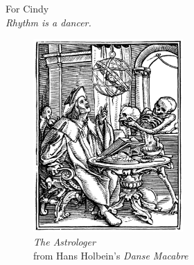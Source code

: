 
For Cindy\\ 
\vspace{\baselineskip}
\emph{Rhythm is a dancer.}

\begin{figure}
    \vspace{50pt}
    \centering
    \includegraphics[width=0.51\textwidth]{assets/holbein-astrologer.jpg}
    \\
    \emph{The Astrologer}
    \\
    from Hans Holbein's \emph{Danse Macabre}
\end{figure}